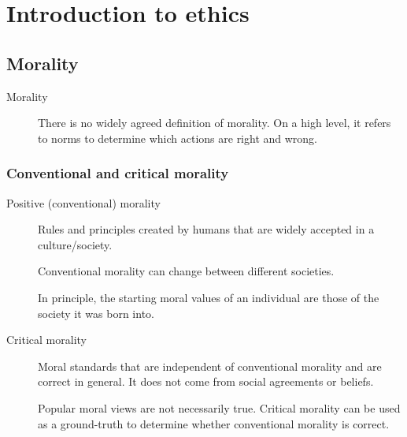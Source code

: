\chapter{Introduction to ethics}



\section{Morality}

\begin{description}
    \item[Morality] 
        There is no widely agreed definition of morality. On a high level, it refers to norms to determine which actions are right and wrong.  
\end{description}


\subsection{Conventional and critical morality}

\begin{description}
    \item[Positive (conventional) morality] 
        Rules and principles created by humans that are widely accepted in a culture/society.

        \begin{remark}
            Conventional morality can change between different societies.
        \end{remark}
        
        \begin{remark}
            In principle, the starting moral values of an individual are those of the society it was born into.
        \end{remark}

    \item[Critical morality] 
        Moral standards that are independent of conventional morality and are correct in general. It does not come from social agreements or beliefs.

        \begin{remark}
            Popular moral views are not necessarily true. Critical morality can be used as a ground-truth to determine whether conventional morality is correct.
        \end{remark}
\end{description}


